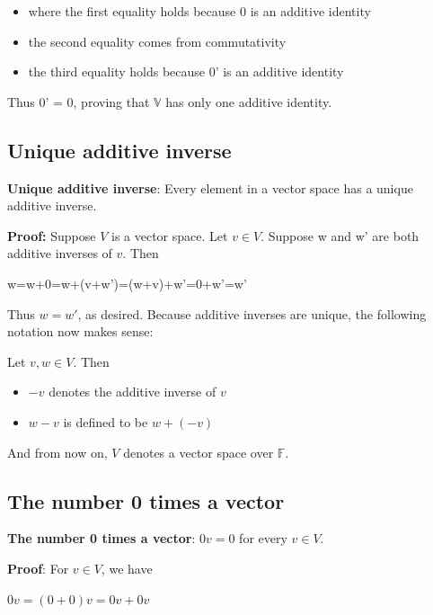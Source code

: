 \documentclass{report}
\begin{document}
\begin{itemize}
    \item where the first equality holds because 0 is an additive identity
    \item the second equality comes from commutativity
    \item the third equality holds because 0' is an additive identity
\end{itemize}
Thus 0' = 0, proving that $\mathbb{V}$ has only one additive identity.\newline

\subsection{Unique additive inverse}
\noindent \textbf{Unique additive inverse}: Every element in a vector space has a unique additive inverse.\newline

\noindent \textbf{Proof:}\newline
\noindent Suppose $V$ is a vector space. Let $v \in V$. Suppose w and w' are both additive inverses of $v$.\newline
\noindent Then \newline
\centerline{w=w+0=w+(v+w')=(w+v)+w'=0+w'=w'}\newline\newline
Thus $w=w'$, as desired.\newline
Because additive inverses are unique, the following notation now makes sense:\newline\newline

Let $v,w \in V$. Then\newline
\begin{itemize}
    \item $-v$ denotes the additive inverse of $v$
    \item $w-v$ is defined to be $w+(-v)$
\end{itemize}

\noindent And from now on, $V$ denotes a vector space over $\mathbb{F}$.

\subsection{The number 0 times a vector}
\noindent \textbf{The number 0 times a vector}: $0v=0$ for every $v \in V$.\newline

\noindent \textbf{Proof}:\newline
\noindent For $v \in V$, we have\newline
\centerline{$0v=(0+0)v=0v+0v$}\newline\newline
\end{document}
